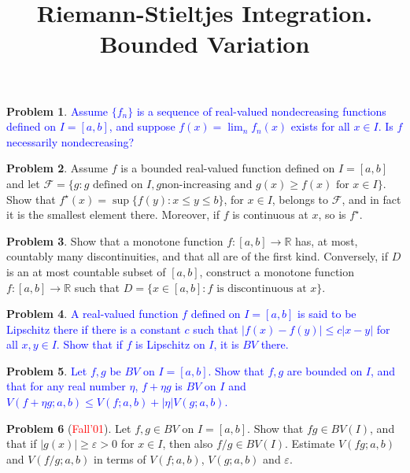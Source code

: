\documentclass[12pt]{amsart}
\def\field#1{\mathbb{#1}}
\def\abs#1{\lvert {#1} \rvert}
\theoremstyle{definition}
\newtheorem{problem}{Problem}
\theoremstyle{remark}
\begin{document}
\title{Riemann-Stieltjes Integration. Bounded Variation}
\maketitle

\begin{problem}
  \textcolor{blue}{ Assume $\{ f_n\}$ is a sequence of real-valued
    nondecreasing functions defined on $I=[a,b]$, and suppose $f(x) =
    \lim_n f_n(x)$ exists for all $x \in I$.  Is $f$ necessarily
    nondecreasing?}
\end{problem}
\begin{problem}
  Assume $f$ is a bounded real-valued function defined on $I=[a,b]$
  and let $\mathcal{F} = \{ g: g \text{ defined on }I, g \text{
    non-increasing and }g(x) \geq f(x)\text{ for }x\in I\}$.  Show
  that $f^\star (x) = \sup \{ f(y) : x\leq y \leq b\}$, for $x \in I$,
  belongs to $\mathcal{F}$, and in fact it is the smallest element
  there.  Moreover, if $f$ is continuous at $x$, so is $f^\star$.
\end{problem}
\begin{problem}
  Show that a monotone function $f\colon [a,b] \to \field{R}$ has, at
  most, countably many discontinuities, and that all are of the first
  kind. Conversely, if $D$ is an at most countable subset of $[a,b]$,
  construct a monotone function $f\colon [a,b] \to \field{R}$ such
  that $D = \{ x\in [a,b] : f \text{ is discontinuous at }x \}$.
\end{problem}
\begin{problem}
  \textcolor{blue}{ A real-valued function $f$ defined on $I = [a,b]$
    is said to be Lipschitz there if there is a constant $c$ such that
    $\abs{ f(x) - f(y)} \leq c\abs{ x-y }$ for all $x,y \in I$.  Show
    that if $f$ is Lipschitz on $I$, it is $BV$ there.}
\end{problem}
\begin{problem}
  \textcolor{blue}{ Let $f,g$ be $BV$ on $I=[a,b]$.  Show that $f,g$
    are bounded on $I$, and that for any real number $\eta$, $f+\eta
    g$ is $BV$ on $I$ and $V(f+\eta g; a, b) \leq V(f; a,b) +
    \abs{\eta} V(g; a,b)$.}
\end{problem}
\begin{problem}[\textcolor{red}{Fall'01}]
  Let $f,g \in BV$ on $I=[a,b]$.  Show that $fg \in BV(I)$, and that
  if $\abs{g(x)} \geq \varepsilon > 0$ for $x \in I$, then also $f/g
  \in BV(I)$.  Estimate $V(fg; a,b)$ and $V(f/g; a,b)$ in terms of
  $V(f;a,b)$, $V(g;a,b)$ and $\varepsilon$.
\end{problem}
\end{document}
